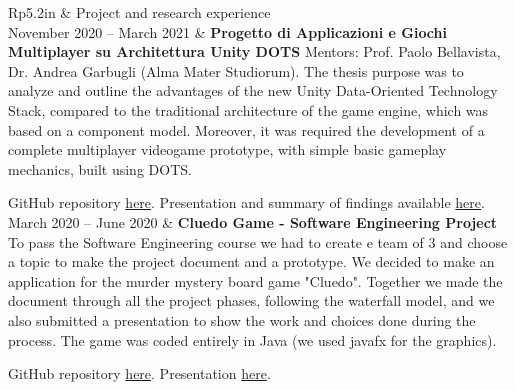 \documentclass[letterpaper, 11pt]{article}
\newcommand{\headingfont}{\Large\color{OliveGreen}}
\newenvironment{SectionTable}[1]{
	\renewcommand*{\arraystretch}{1.7}
	\setlength{\tabcolsep}{10pt}
	\begin{longtable}{Rp{5.2in}} & #1 \\}
{\end{longtable}\vspace{-.3cm}}
\newenvironment{SectionTableSingleSpace}[1]{
	\renewcommand*{\arraystretch}{1.2}
	\setlength{\tabcolsep}{10pt}
	\begin{longtable}{Rp{5.2in}} & #1 \\[0.6em]}
{\end{longtable}\vspace{-.3cm}}
\begin{document}





\begin{SectionTable}{\headingfont Project and research experience}
November 2020 -- March 2021 &
\textbf{Progetto di Applicazioni e Giochi Multiplayer su Architettura Unity DOTS} \newline
Mentors: Prof. Paolo Bellavista, Dr. Andrea Garbugli (Alma Mater Studiorum). \newline
The thesis purpose was to analyze and outline the advantages of the new Unity Data-Oriented Technology Stack, compared to the traditional architecture of the game engine, which was based on a component model. Moreover, it was required the development of a complete multiplayer videogame prototype, with simple basic gameplay mechanics, built using DOTS.

GitHub repository \href{https://github.com/mikyll/UnityDOTS-Thesis}{here}. Presentation and summary of findings available \href{https://github.com/mikyll/UnityDOTS-Thesis/blob/main/Presentation/PresentationDOTS (pdf).pdf}{here}.\\

March 2020 -- June 2020 &
\textbf{Cluedo Game - Software Engineering Project} \newline
To pass the Software Engineering course we had to create e team of 3 and choose a topic to make the project document and a prototype. We decided to make an application for the murder mystery board game "Cluedo". Together we made the document through all the project phases, following the waterfall model, and we also submitted a presentation to show the work and choices done during the process. The game was coded entirely in Java (we used javafx for the graphics).

GitHub repository \href{https://github.com/mikyll/Cluedo}{here}. Presentation \href{https://github.com/mikyll/Cluedo/blob/master/Presentazione/Presentazione Cluedo (pdf).pdf}{here}.\\
\end{SectionTable}
\end{document}
